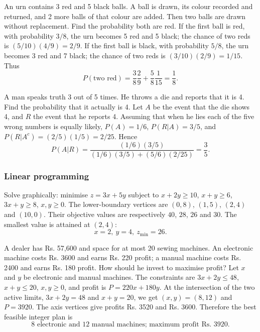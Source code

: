 \begin{enumerate}[label={},leftmargin=0pt,itemsep=9pt]
 An urn contains 3 red and 5 black balls. A ball is drawn, its colour recorded and returned, and 2 more balls of that colour are added. Then two balls are drawn without replacement. Find the probability both are red.
\solution If the first ball is red, with probability $3/8$, the urn becomes 5 red and 5 black; the chance of two reds is $(5/10)(4/9)=2/9$. If the first ball is black, with probability $5/8$, the urn becomes 3 red and 7 black; the chance of two reds is $(3/10)(2/9)=1/15$. Thus
\[
P(\text{two red})=\frac38\frac29+\frac58\frac1{15}=\boxed{\frac18}.
\]

 A man speaks truth 3 out of 5 times. He throws a die and reports that it is 4. Find the probability that it actually is 4.
\solution Let $A$ be the event that the die shows 4, and $R$ the event that he reports 4. Assuming that when he lies each of the five wrong numbers is equally likely, $P(A)=1/6$, $P(R|A)=3/5$, and $P(R|A^c)=(2/5)(1/5)=2/25$. Hence
\[
P(A|R)=\frac{(1/6)(3/5)}{(1/6)(3/5)+(5/6)(2/25)}=\boxed{\frac35}.
\]
\end{enumerate}

\subsubsection{Linear programming}
\begin{enumerate}[label={},leftmargin=0pt,itemsep=9pt]
 Solve graphically: minimise $z=3x+5y$ subject to $x+2y\ge10$, $x+y\ge6$, $3x+y\ge8$, $x,y\ge0$.
\solution The lower-boundary vertices are $(0,8)$, $(1,5)$, $(2,4)$ and $(10,0)$. Their objective values are respectively $40$, $28$, $26$ and $30$. The smallest value is attained at $(2,4)$:
\[
\boxed{x=2,\ y=4,\ z_{\min}=26}.
\]

 A dealer has Rs. 57,600 and space for at most 20 sewing machines. An electronic machine costs Rs. 3600 and earns Rs. 220 profit; a manual machine costs Rs. 2400 and earns Rs. 180 profit. How should he invest to maximise profit?
\solution Let $x$ and $y$ be electronic and manual machines. The constraints are $3x+2y\le48$, $x+y\le20$, $x,y\ge0$, and profit is $P=220x+180y$. At the intersection of the two active limits, $3x+2y=48$ and $x+y=20$, we get $(x,y)=(8,12)$ and $P=3920$. The axis vertices give profits Rs. 3520 and Rs. 3600. Therefore the best feasible integer plan is
\[
\boxed{8\text{ electronic and }12\text{ manual machines; maximum profit Rs. }3920}.
\]
\end{enumerate}



